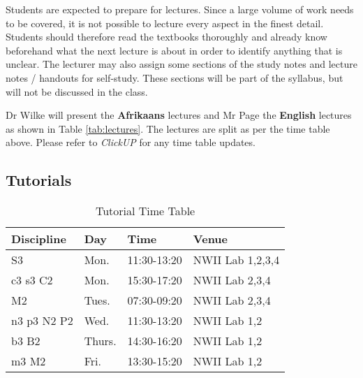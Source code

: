        Students are expected to prepare for lectures. Since a large volume of work
        needs to be covered, it is not possible to lecture every aspect in the
        finest detail. Students should therefore read the textbooks thoroughly
        and already know beforehand what the next lecture is about in order to
        identify anything that is unclear. The lecturer may also assign some
        sections of the study notes and lecture notes / handouts for self-study.
        These sections will be part of the syllabus, but will not be discussed
        in the class.

        Dr Wilke will present the \textbf{Afrikaans} lectures and Mr
        Page the \textbf{English} lectures as shown in Table
        \ref{tab:lectures}. The lectures are split as per the time
        table above. Please refer to {\it ClickUP} for any time table
        updates.

    \subsection{Tutorials}
        \begin{table}[!h]
            \begin{center}
             \begin{tabular}{|l|l|l|l|}
               \hline
               {\bf Discipline} & {\bf Day} & {\bf Time} & {\bf Venue} \\
               \hline
               S3          & Mon.   & 11:30-13:20 & NWII Lab 1,2,3,4 \\
               c3 s3 C2    & Mon.   & 15:30-17:20 & NWII Lab 2,3,4 \\
               M2          & Tues.  & 07:30-09:20 & NWII Lab 2,3,4 \\
               n3 p3 N2 P2 & Wed.   & 11:30-13:20 & NWII Lab 1,2 \\
               b3 B2       & Thurs. & 14:30-16:20 & NWII Lab 1,2 \\
               m3 M2       & Fri.   & 13:30-15:20 & NWII Lab 1,2 \\
               \hline
             \end{tabular}
             \caption{Tutorial Time Table\protect\footnotemark}
            \label{tab:tutorials}
            \end{center}
        \end{table}

